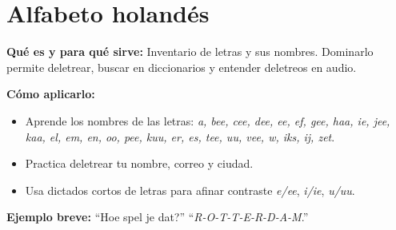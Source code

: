 \section{Alfabeto holandés}
\textbf{Qué es y para qué sirve:} Inventario de letras y sus nombres. Dominarlo permite deletrear, buscar en diccionarios y entender deletreos en audio.

\textbf{Cómo aplicarlo:}
\begin{itemize}[leftmargin=*]
  \item Aprende los nombres de las letras: \textit{a, bee, cee, dee, ee, ef, gee, haa, ie, jee, kaa, el, em, en, oo, pee, kuu, er, es, tee, uu, vee, w, iks, ij, zet}.
  \item Practica deletrear tu nombre, correo y ciudad.
  \item Usa dictados cortos de letras para afinar contraste \textit{e/ee}, \textit{i/ie}, \textit{u/uu}.
\end{itemize}

\textbf{Ejemplo breve:}
\enquote{Hoe spel je dat?} \enquote{\textit{R-O-T-T-E-R-D-A-M}.}
